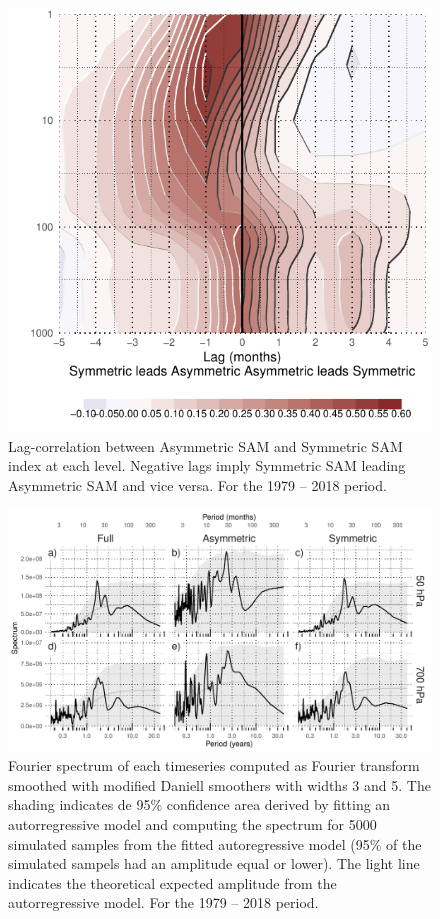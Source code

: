 \documentclass[smallextended]{svjour3}       %
\begin{document}
\begin{figure}[ht]
\includegraphics{A1-1} \caption{Lag-correlation between Asymmetric SAM and Symmetric SAM index at each level. Negative lags imply Symmetric SAM leading Asymmetric SAM and vice versa. For the 1979 -- 2018 period.}\label{fig:A1}
\end{figure}

\begin{figure}
\includegraphics{A2-1} \caption{Fourier spectrum of each timeseries computed as Fourier transform smoothed with modified Daniell smoothers with widths 3 and 5. The shading indicates de 95\% confidence area derived by fitting an autorregressive model and computing the spectrum for 5000 simulated samples from the fitted autoregressive model (95\% of the simulated sampels had an amplitude equal or lower). The light line indicates the theoretical expected amplitude from the autorregressive model. For the 1979 -- 2018 period.}\label{fig:A2}
\end{figure}
\end{document}
